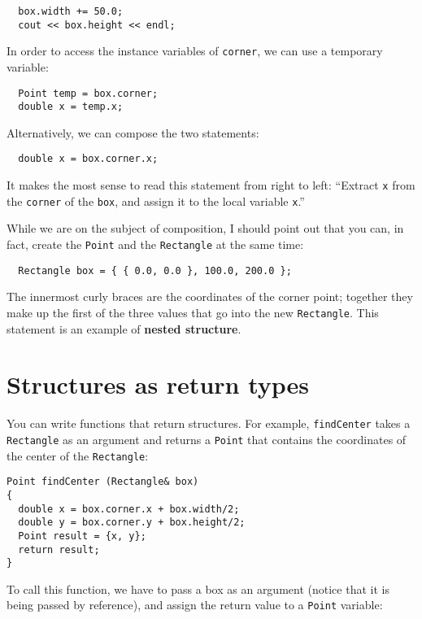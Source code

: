 \begin{verbatim}
  box.width += 50.0;
  cout << box.height << endl;
\end{verbatim}
%
In order to access the instance variables of {\tt corner}, we can use a
temporary variable:

\begin{verbatim}
  Point temp = box.corner;
  double x = temp.x;
\end{verbatim}
%
Alternatively, we can compose the two statements:


\begin{verbatim}
  double x = box.corner.x;
\end{verbatim}
%
It makes the most sense to read this statement from right to
left: ``Extract {\tt x} from the {\tt corner} of the {\tt box},
and assign it to the local variable {\tt x}.''

While we are on the subject of composition, I should point
out that you can, in fact, create the {\tt Point} and the
{\tt Rectangle} at the same time:

\begin{verbatim}
  Rectangle box = { { 0.0, 0.0 }, 100.0, 200.0 };
\end{verbatim}
%
The innermost curly braces are the coordinates of the
corner point; together they make up the first of the three
values that go into the new {\tt Rectangle}.  This statement
is an example of {\bf nested structure}.



\section{Structures as return types}

You can write functions that return structures.  For example,
{\tt findCenter} takes a {\tt Rectangle} as an argument and
returns a {\tt Point} that contains the coordinates of the
center of the {\tt Rectangle}:

\begin{verbatim}
Point findCenter (Rectangle& box)
{
  double x = box.corner.x + box.width/2;
  double y = box.corner.y + box.height/2;
  Point result = {x, y};
  return result;
}
\end{verbatim}
%
To call this function, we have to pass a box as an argument
(notice that it is being passed by reference), and assign the
return value to a {\tt Point} variable:

